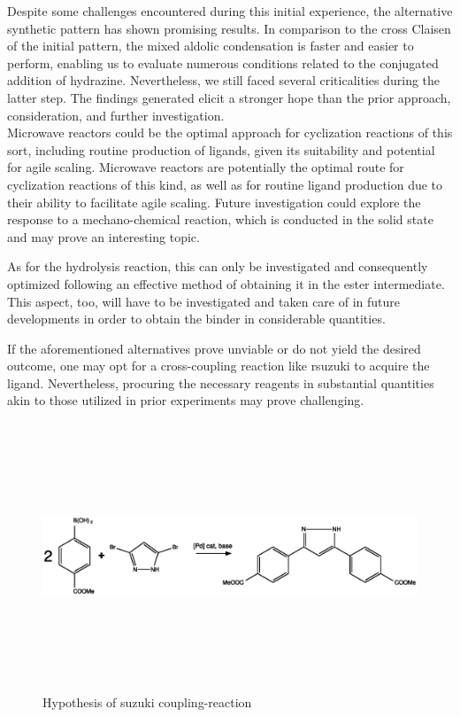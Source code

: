 \documentclass[../Master.tex]{subfiles}
\begin{document}
Despite some challenges encountered during this initial experience, the alternative synthetic pattern has shown promising results. In comparison to the cross Claisen of the initial pattern, the mixed aldolic condensation is faster and easier to perform, enabling us to evaluate numerous conditions related to the conjugated addition of hydrazine. Nevertheless, we still faced several criticalities during the latter step. The findings generated elicit a stronger hope than the prior approach, consideration, and further investigation.\\
Microwave reactors could be the optimal approach for cyclization reactions of this sort, including routine production of ligands, given its suitability and potential for agile scaling.
Microwave reactors are potentially the optimal route for cyclization reactions of this kind, as well as for routine ligand production due to their ability to facilitate agile scaling.
Future investigation could explore the response to a mechano-chemical reaction, which is conducted in the solid state and may prove an interesting topic.

As for the hydrolysis reaction, this can only be investigated and consequently optimized following an effective method of obtaining it in the ester intermediate. This aspect, too, will have to be investigated and taken care of in future developments in order to obtain the binder in considerable quantities.

\newpage
If the aforementioned alternatives prove unviable or do not yield the desired outcome, one may opt for a cross-coupling reaction like rsuzuki to acquire the ligand. Nevertheless, procuring the necessary reagents in substantial quantities akin to those utilized in prior experiments may prove challenging.

\begin{figure}[h!]
	\centering
	\includegraphics[width=14cm,height=8cm,keepaspectratio]{Structures/suzuki.eps}
	\caption{Hypothesis of suzuki coupling-reaction}
\end{figure}
\end{document}
